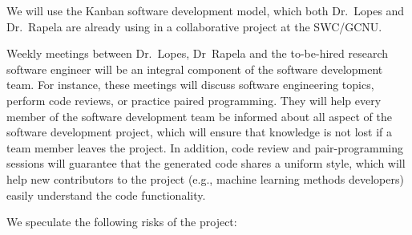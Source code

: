 \documentclass[a4paper,11pt]{article}
\begin{document}
We will use the Kanban software development model, which both Dr.~Lopes and
Dr.~Rapela are already using in a collaborative project at the SWC/GCNU.

Weekly meetings between Dr.~Lopes, Dr~Rapela and the to-be-hired research
software engineer will be an integral component of the software development
team. For instance, these meetings will discuss software engineering
topics, perform code reviews, or practice paired programming. They will help
every member of the software development team be informed about all aspect of
the software development project, which will ensure that knowledge is not lost
if a team member leaves the project. In addition, code review and
pair-programming sessions will guarantee that the generated code shares a
uniform style, which will help new contributors to the project (e.g., machine
learning methods developers) easily understand the code functionality.

We speculate the following risks of the project:
\end{document}
